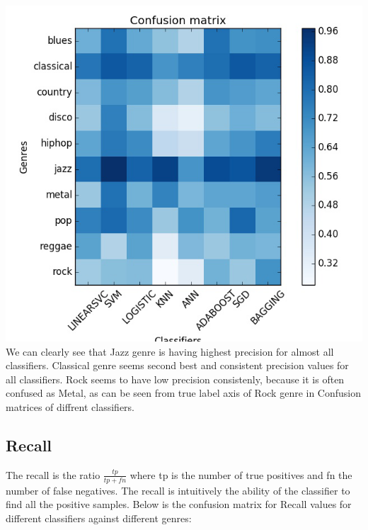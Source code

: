\documentclass[conference]{IEEEtran}
\begin{document}
\includegraphics[width=\columnwidth]{precision}
We can clearly see that Jazz genre is having highest precision for almost all classifiers. Classical genre seems second best and consistent precision values for all classifiers. Rock seems to have low precision consistenly, because it is often confused as Metal, as can be seen from true label axis of Rock genre in Confusion matrices of diffrent classifiers.
\subsection{Recall}
The recall is the ratio $\frac{tp}{tp + fn}$ where tp is the number of true positives and fn the number of false negatives. The recall is intuitively the ability of the classifier to find all the positive samples.
Below is the confusion matrix for Recall values for different classifiers against different genres:
\end{document}
